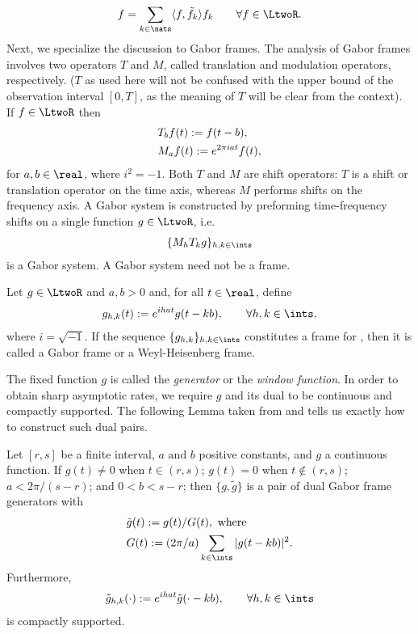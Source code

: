 \begin{align}
  f = \sumn \langle f, \tilde{f}_k\rangle f_k \qquad \forall f \in \LtwoR.
  \label{eq:dual}
\end{align}
Next, we specialize the discussion to Gabor frames. The analysis of Gabor frames involves two operators $T$ and $M$, called  translation and modulation operators, respectively. ($T$ as used here will not be confused with the upper bound of the observation interval $[0,T]$, as the meaning of $T$ will be clear from the context). If $f \in \LtwoR$ then 
\begin{align}
  & T_bf(t) := f(t -  b),  \notag\\
  & M_af(t) := e^{2\pi iat}f(t), \notag 
  \label{}
\end{align}
for $a,b \in \real$, where $i^2 = -1$. Both $T$ and $M$ are shift operators: $T$ is a shift or translation operator on the time axis, whereas $M$ performs shifts on the frequency axis. A Gabor system is constructed by preforming time-frequency shifts on a single function $g \in \LtwoR$, i.e. 
\begin{align}
  \{M_h T_k g\}_{h,k \in \ints}\notag
  \label{}
\end{align}
is a Gabor system. A Gabor system need not be a frame.
\begin{defn}
  Let $g \in \LtwoR$ and $a,b >0$ and,  for all $t \in \real$, define  
\begin{align}
  g_{h,k}(t) := e^{i h a t }g(t - k b), \qquad  \forall h,k \in \ints, \notag    
 \end{align}
 where $i = \sqrt{-1}$. If the sequence $\{g_{h,k}\}_{h,k \in \ints}$ constitutes a  frame for \LtwoR, then it is called a Gabor frame or a Weyl-Heisenberg frame. 
\end{defn}
\noindent The fixed function $g$ is called  the \emph{generator} or the \emph{window function}.  
In order to obtain sharp asymptotic rates, we require $g$ and its dual \tg to be continuous and compactly supported. The following Lemma taken from \cite{Christensen2006} and \cite{Zhang2008} tells us exactly how to construct such dual pairs.
\begin{lem}\label{le:gabor}
  Let $[r,s]$ be a finite interval, $a\text{ and }b$ positive constants,  and $g$ a continuous function. If $g(t) \ne 0$ when $t \in (r,s)$; $g(t) = 0$ when $t \notin (r,s)$; $a < 2\pi/(s-r)$; and $0<b<s-r$; then  $\{g,\tilde{g}\}$ is a pair of dual Gabor frame generators with 
\begin{align}
  &\tilde{g}(t)  := g(t)/G(t), \text{ where} \label{eq:dualg}\\
  &G(t) := (2\pi/a)\sumi|g(t-kb)|^2.\label{eq:capg}
\end{align}
Furthermore, 
\begin{align}
  \tilde{g}_{h,k}(\cdot) := e^{ihat} \tilde{g}(\cdot - kb), \qquad \forall h, k \in \ints \label{eq:dualghk}
\end{align}
is compactly supported.   
\end{lem}
